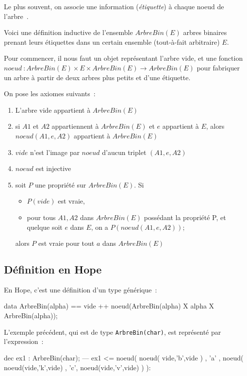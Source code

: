 Le plus souvent, on associe une information (\emph{étiquette}) à
chaque noeud de l'arbre~.

\begin{center}

\end{center}


Voici une définition inductive de l'ensemble $ArbreBin(E)$ arbres
binaires prenant leurs étiquettes dans un certain ensemble
(tout-à-fait arbitraire) $E$. 

Pour commencer, il nous faut un objet représentant l'arbre
vide, et une fonction $noeud~: ArbreBin(E) \times E \times ArbreBin(E) \rightarrow
ArbreBin(E)$ pour fabriquer un arbre à partir de deux arbres plus
petits et d'une étiquette.

On pose les axiomes suivants~:
\begin{enumerate}
\item L'arbre vide appartient à $ArbreBin(E)$
\item si $A1$ et $A2$ appartiennent à $ArbreBin(E)$ et $e$ appartient à $E$,
		alors $noeud(A1,e,A2)$ appartient à $ArbreBin(E)$
\item $vide$ n'est l'image par $noeud$ d'aucun triplet $(A1,e,A2)$
\item  $noeud$ est injective
\item soit $P$ une propriété sur $ArbreBin(E)$. Si
\begin{itemize}
\item $P(vide)$ est vraie, 
\item pour tous $A1,A2$ dans $ArbreBin(E)$ possédant la propriété P, 
et quelque soit $e$ dans $E$, on a  $P( noeud(A1,e,A2) )$;
\end{itemize}
		alors $P$ est vraie pour tout $a$ dans $ArbreBin(E)$
\end{enumerate}

\subsection{Définition en Hope}

En Hope, c'est une définition d'un type générique~:

\begin{verbatimtab}
data ArbreBin(alpha) == vide 
                     ++ noeud(ArbreBin(alpha) X alpha X ArbreBin(alpha));
\end{verbatimtab}

L'exemple précédent, qui est de type \texttt{ArbreBin(char)}, est représenté par l'expression~:
\begin{verbatimtab}
dec ex1 : ArbreBin(char);
--- ex1 <= noeud( noeud( vide,'b',vide ) , 
		'a' , 
		noeud( noeud(vide,'k',vide) , 
			'c', 
			noeud(vide,'v',vide) ) ):
\end{verbatimtab}

